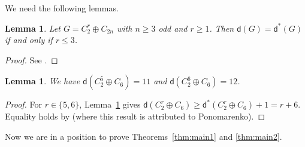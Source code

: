 \documentclass[10pt,a4paper]{amsart}
\newtheorem{lemma}[theorem]{\bf Lemma}
\newcommand{\dd}{\mathsf d}
\begin{document}
We need the following lemmas.


\begin{lemma} \label{2.1}
Let $G = C_2^r \oplus C_{2n}$ with $n\ge3$ odd and $r\ge1$. 
Then $\mathsf d(G)=\mathsf d^*(G)$ if and only if $r\le3$.
\end{lemma}

\begin{proof}
See \cite[Theorem 3.9.7]{Ge-Gr-Zh26a}.
\end{proof}

\begin{lemma}\label{lem:davenport}
We have  $\dd(C_2^5\oplus C_6)=11$ and $\dd(C_2^6\oplus C_6)=12$.
\end{lemma}

\begin{proof}
For $r\in\{5,6\}$, Lemma~\ref{2.1} gives
$\mathsf d(C_2^r\oplus C_6)
 \ge \mathsf d^*(C_2^r\oplus C_6)+1=r+6.$
Equality holds by
\cite[p.~2]{Sc11b} (where this result is  attributed to Ponomarenko).
\end{proof}



Now we are in a position to prove Theorems~\ref{thm:main1} and \ref{thm:main2}.
\end{document}
